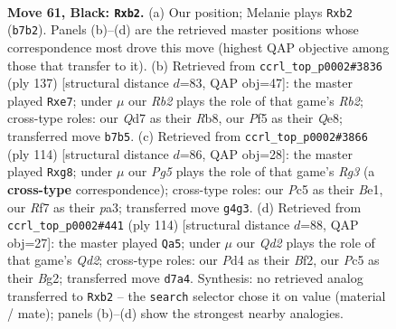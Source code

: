 \documentclass[11pt]{article}
\begin{document}
\clearpage

\begin{figure}[p]\centering
\begin{subfigure}{0.46\textwidth}\centering
\resizebox{\linewidth}{!}{%
\newchessgame
\chessboard[
  setfen={n7/1r1qbrk1/Q7/P1p2p1p/3p1Pp1/8/1RRBP2P/3N2K1 b - - 5 61},
  showmover=false,
  pgfstyle=straightmove, color=movearrow, markmove={b7-b2}
]}
\caption{}
\end{subfigure}\hfill
\begin{subfigure}{0.46\textwidth}\centering
\resizebox{\linewidth}{!}{%
\newchessgame
\chessboard[
  setfen={1r2q3/1r2P2k/QRp3p1/p4p2/P1PB1b1p/7P/2P3P1/4RK2 b - - 0 69},
  showmover=false,
  pgfstyle=straightmove, color=movearrow, markmove={b7-e7}
]}
\caption{}
\end{subfigure}
\\[4pt]
\begin{subfigure}{0.46\textwidth}\centering
\resizebox{\linewidth}{!}{%
\newchessgame
\chessboard[
  setfen={r5r1/4bk2/2R5/1p1q1p1p/1P1PpP2/p3P1R1/P7/2Q1B2K w - - 0 58},
  showmover=false,
  pgfstyle=straightmove, color=movearrow, markmove={g3-g8}
]}
\caption{}
\end{subfigure}\hfill
\begin{subfigure}{0.46\textwidth}\centering
\resizebox{\linewidth}{!}{%
\newchessgame
\chessboard[
  setfen={1r1r4/k4pp1/p3p1b1/2n1P3/2Pp2P1/3P3R/2RQ1BBK/1q6 w - - 34 58},
  showmover=false,
  pgfstyle=straightmove, color=movearrow, markmove={d2-a5}
]}
\caption{}
\end{subfigure}
\caption{\textbf{Move 61, Black: \texttt{Rxb2}.} (a) Our position; Melanie plays \texttt{Rxb2} (\texttt{b7b2}). Panels (b)--(d) are the retrieved master positions whose correspondence most drove this move (highest QAP objective among those that transfer to it). (b) Retrieved from \texttt{ccrl\_top\_p0002\#3836} (ply 137) [structural distance $d$=83, QAP obj=47]: the master played \texttt{Rxe7}; under $\mu$ our \emph{Rb2} plays the role of that game's \emph{Rb2}; cross-type roles: our \emph{Q}d7 as their \emph{R}b8, our \emph{P}f5 as their \emph{Q}e8; transferred move \texttt{b7b5}. (c) Retrieved from \texttt{ccrl\_top\_p0002\#3866} (ply 114) [structural distance $d$=86, QAP obj=28]: the master played \texttt{Rxg8}; under $\mu$ our \emph{Pg5} plays the role of that game's \emph{Rg3} (a \textbf{cross-type} correspondence); cross-type roles: our \emph{P}c5 as their \emph{B}e1, our \emph{R}f7 as their \emph{p}a3; transferred move \texttt{g4g3}. (d) Retrieved from \texttt{ccrl\_top\_p0002\#441} (ply 114) [structural distance $d$=88, QAP obj=27]: the master played \texttt{Qa5}; under $\mu$ our \emph{Qd2} plays the role of that game's \emph{Qd2}; cross-type roles: our \emph{P}d4 as their \emph{B}f2, our \emph{P}c5 as their \emph{B}g2; transferred move \texttt{d7a4}. Synthesis: no retrieved analog transferred to \texttt{Rxb2} -- the \texttt{search} selector chose it on value (material / mate); panels (b)--(d) show the strongest nearby analogies.}
\label{fig:thought-m121}
\end{figure}
\end{document}
